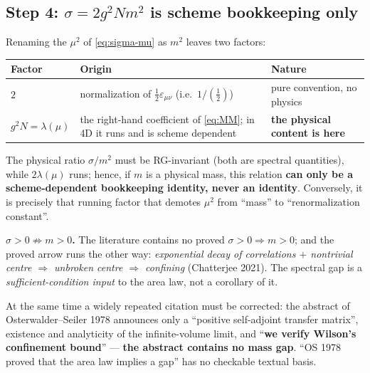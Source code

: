 \subsection{Step 4: $\sigma=2g^{2}Nm^{2}$ is scheme bookkeeping only}

Renaming the $\mu^{2}$ of \eqref{eq:sigma-mu} as $m^{2}$ leaves two factors: \LT
\begin{center}\footnotesize
\begin{tabularx}{\textwidth}{@{}l l X@{}}
\toprule
Factor & Origin & Nature\\
\midrule
$2$ & normalization of $\tfrac12\varepsilon_{\mu\nu}$ (i.e.\ $1/(\tfrac12)$) & pure convention, no physics\\
$g^{2}N=\lambda(\mu)$ & the right-hand coefficient of \eqref{eq:MM}; in 4D it runs and is scheme dependent & \textbf{the physical content is here}\\
\bottomrule
\end{tabularx}
\end{center}
The physical ratio $\sigma/m^{2}$ must be RG-invariant (both are spectral quantities), while
$2\lambda(\mu)$ runs; hence, if $m$ is a physical mass, this relation \textbf{can only be a
scheme-dependent bookkeeping identity, never an identity}. Conversely, it is precisely that running
factor that demotes $\mu^{2}$ from ``mass'' to ``renormalization constant''. \LT
{}

\begin{keybox}
\textbf{$\sigma>0\not\Rightarrow m>0$.} The literature contains no proved
$\sigma>0\Rightarrow m>0$; and the proved arrow runs the other way: \emph{exponential decay of
correlations $+$ nontrivial centre $\Rightarrow$ unbroken centre $\Rightarrow$ confining}
(Chatterjee 2021). The spectral gap is a \emph{sufficient-condition input} to the area law, not a
corollary of it. \LN
\end{keybox}

\noindent
At the same time a widely repeated citation must be corrected: the abstract of Osterwalder--Seiler
1978 announces only a ``positive self-adjoint transfer matrix'', existence and analyticity of the
infinite-volume limit, and ``\textbf{we verify Wilson's confinement bound}'' --- \textbf{the abstract
contains no mass gap}. ``OS 1978 proved that the area law implies a gap'' has no checkable textual
basis. \LT
{}

